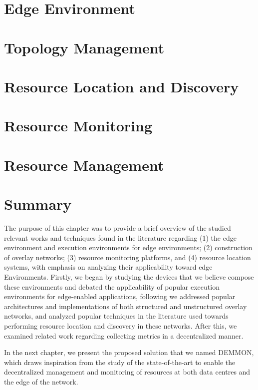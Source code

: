 \section{Edge Environment} \label{sec:edge_computing} 


\section{Topology Management} \label{sec:topology_management} 

\section{Resource Location and Discovery} \label{sec:res_location} 

\section{Resource Monitoring} \label{sec:res_monitoring} 

\section{Resource Management} \label{sec:res_management} 

\section{Summary}

The purpose of this chapter was to provide a brief overview of the studied relevant works and techniques found in the literature regarding (1) the edge environment and execution environments for edge environments; (2) construction of overlay networks; (3) resource monitoring platforms, and (4) resource location systems, with emphasis on analyzing their applicability toward edge Environments. Firstly, we began by studying the devices that we believe compose these environments and debated the applicability of popular execution environments for edge-enabled applications, following we addressed popular architectures and implementations of both structured and unstructured overlay networks, and analyzed popular techniques in the literature used towards performing resource location and discovery in these networks. After this, we examined related work regarding collecting metrics in a decentralized manner.

In the next chapter, we present the proposed solution that we named DEMMON, which draws inspiration from the study of the state-of-the-art to enable the decentralized management and monitoring of resources at both data centres and the edge of the network.
